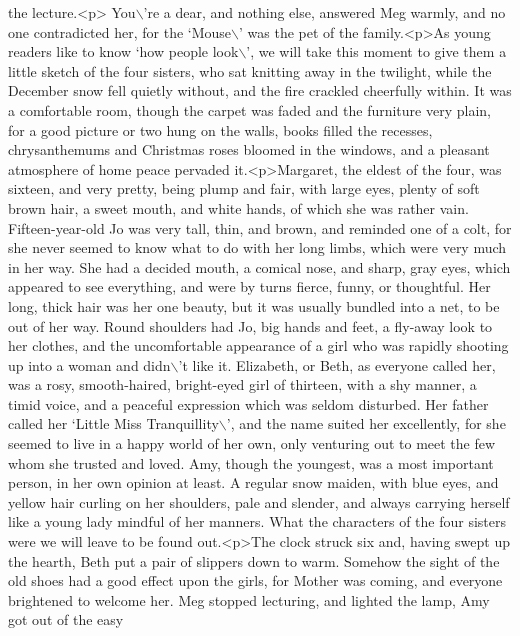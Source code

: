 \begin{DoxyCode}
{       the lecture.<p> You\(\backslash\)'re a dear, and nothing else,  answered Meg warmly, and no one contradicted her, for the
       `Mouse\(\backslash\)' was the pet of the family.<p>As young readers like to know `how people look\(\backslash\)', we will take this
       moment to give them a little sketch of the four sisters, who sat knitting away in the twilight, while the
       December snow fell quietly without, and the fire crackled cheerfully within. It was a comfortable room, though
       the carpet was faded and the furniture very plain, for a good picture or two hung on the walls, books filled
       the recesses, chrysanthemums and Christmas roses bloomed in the windows, and a pleasant atmosphere of home
       peace pervaded it.<p>Margaret, the eldest of the four, was sixteen, and very pretty, being plump and fair,
       with large eyes, plenty of soft brown hair, a sweet mouth, and white hands, of which she was rather vain.
       Fifteen-year-old Jo was very tall, thin, and brown, and reminded one of a colt, for she never seemed to know
       what to do with her long limbs, which were very much in her way. She had a decided mouth, a comical nose, and
       sharp, gray eyes, which appeared to see everything, and were by turns fierce, funny, or thoughtful. Her long,
       thick hair was her one beauty, but it was usually bundled into a net, to be out of her way. Round shoulders
       had Jo, big hands and feet, a fly-away look to her clothes, and the uncomfortable appearance of a girl who
       was rapidly shooting up into a woman and didn\(\backslash\)'t like it. Elizabeth, or Beth, as everyone called her, was a
       rosy, smooth-haired, bright-eyed girl of thirteen, with a shy manner, a timid voice, and a peaceful
       expression which was seldom disturbed. Her father called her `Little Miss Tranquillity\(\backslash\)', and the name suited her
       excellently, for she seemed to live in a happy world of her own, only venturing out to meet the few whom she
       trusted and loved. Amy, though the youngest, was a most important person, in her own opinion at least. A
       regular snow maiden, with blue eyes, and yellow hair curling on her shoulders, pale and slender, and always
       carrying herself like a young lady mindful of her manners. What the characters of the four sisters were we will
       leave to be found out.<p>The clock struck six and, having swept up the hearth, Beth put a pair of slippers
       down to warm. Somehow the sight of the old shoes had a good effect upon the girls, for Mother was coming, and
       everyone brightened to welcome her. Meg stopped lecturing, and lighted the lamp, Amy got out of the easy
}
\end{DoxyCode}
